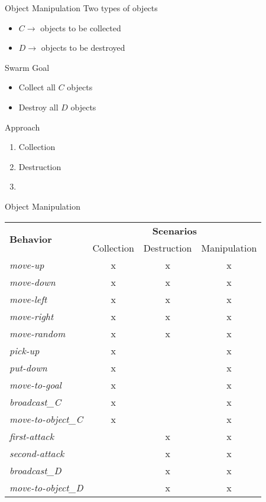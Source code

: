 \begin{slide}{Object Manipulation}
  Two types of objects
  \begin{itemize}
  \item $C \rightarrow$ objects to be collected
  \item $D \rightarrow$ objects to be destroyed
  \end{itemize}
  Swarm Goal
  \begin{itemize}
  \item Collect all $C$ objects
  \item Destroy all $D$ objects
  \end{itemize}
  Approach
  \begin{enumerate}
  \item Collection
  \item Destruction
  \item {}
  \end{enumerate}
\end{slide}


\begin{slide}{Object Manipulation} 
  \centering
  \tiny
  \begin{tabular}{|l||c|c|c|}
    \hline
    \multirow{2}{*}{\textbf{Behavior}} & \multicolumn{3}{c|}{\textbf{Scenarios}}  \\
    & Collection & Destruction & Manipulation \\	
    \hline
    \emph{move-up}           & x & x & x \\
    \emph{move-down}         & x & x & x \\
    \emph{move-left}         & x & x & x \\
    \emph{move-right}        & x & x & x \\
    \emph{move-random}       & x & x & x \\
    \emph{pick-up}           & x &   & x \\
    \emph{put-down}          & x &   & x \\
    \emph{move-to-goal}      & x &   & x \\
    \emph{broadcast\_C}      & x &   & x \\
    \emph{move-to-object\_C} & x &   & x \\
    \emph{first-attack}      &   & x & x \\
    \emph{second-attack}     &   & x & x \\
    \emph{broadcast\_D}      &   & x & x \\ 
    \emph{move-to-object\_D} &   & x & x \\
    \hline
  \end{tabular}
\end{slide}

